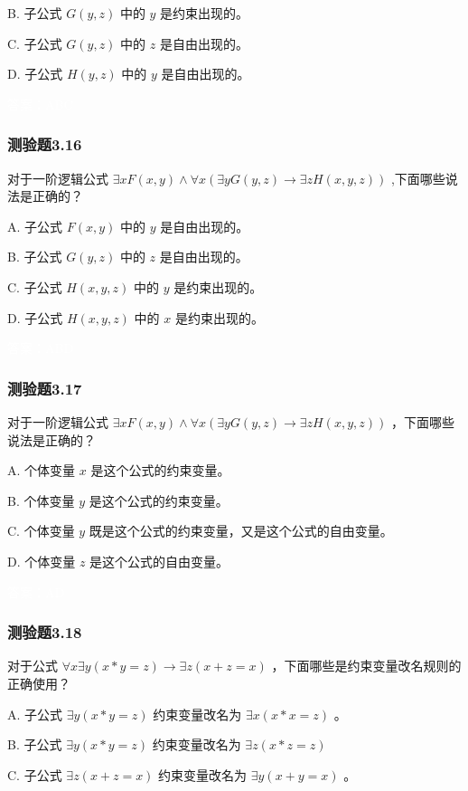 \documentclass[UTF8, heading=true]{ctexart}
\begin{document}
B.  子公式 $G(y, z)$ 中的 $y$ 是约束出现的。

C. 子公式 $G(y, z)$ 中的 $z$ 是自由出现的。

D. 子公式 $H(y, z)$ 中的 $y$ 是自由出现的。

\textcolor{white}{答案：ABC}

\subsubsection{测验题3.16}

对于一阶逻辑公式 $\exists x F(x, y) \wedge \forall x(\exists y G(y, z) \rightarrow \exists z H(x, y, z))$ ,下面哪些说法是正确的？

A. 
子公式 $F(x, y)$ 中的 $y$ 是自由出现的。

B. 
子公式 $G(y, z)$ 中的 $z$ 是自由出现的。

C. 
子公式 $H(x, y, z)$ 中的 $y$ 是约束出现的。

D. 
子公式 $H(x, y, z)$ 中的 $x$ 是约束出现的。

\textcolor{white}{答案：ABD}

\subsubsection{测验题3.17}

对于一阶逻辑公式 $\exists x F(x, y) \wedge \forall x(\exists y G(y, z) \rightarrow \exists z H(x, y, z))$ ，下面哪些说法是正确的？

A. 个体变量 $x$ 是这个公式的约束变量。

B. 个体变量 $y$ 是这个公式的约束变量。

C. 个体变量 $y$ 既是这个公式的约束变量，又是这个公式的自由变量。

D.  个体变量 $z$ 是这个公式的自由变量。

\textcolor{white}{答案：AD}

\subsubsection{测验题3.18}

对于公式 $\forall x \exists y(x * y=z) \rightarrow \exists z(x+z=x)$ ，下面哪些是约束变量改名规则的正确使用？

A. 
子公式 $\exists y(x * y=z)$ 约束变量改名为 $\exists x(x * x=z)$ 。

B. 
子公式 $\exists y(x * y=z)$ 约束变量改名为 $\exists z(x * z=z)$

C. 
子公式 $\exists z(x+z=x)$ 约束变量改名为 $\exists y(x+y=x)$ 。
\end{document}
